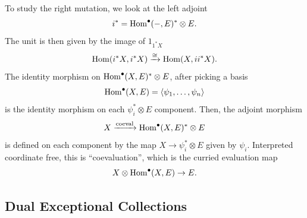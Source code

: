 \documentclass[12pt]{article}
\begin{document}
To study the right mutation, we look at the left adjoint
\[i^* = \mathrm{Hom}^\bullet(-,E)^* \otimes E.\]
The unit is then given by the image of $1_{1^* X}$
\[\mathrm{Hom}(i^* X, i^* X) \xrightarrow{\cong} \mathrm{Hom}(X, ii^* X).\]
The identity morphism on $\mathrm{Hom}^\bullet(X,E)^* \otimes E$, after picking a basis
\[\mathrm{Hom}^\bullet(X,E)=\left\langle\psi_1,\dots,\psi_n\right\rangle\]
is the identity morphism on each $\psi_i^* \otimes E$ component. Then, the adjoint morphism
\[X \xrightarrow{\mathrm{coeval}} \mathrm{Hom}^\bullet(X,E)^* \otimes E\]
is defined on each component by the map $X\to \psi_i^* \otimes E$ given by $\psi_i$. Interpreted coordinate free, this is ``coevaluation'', which is the curried evaluation map
\[X \otimes \mathrm{Hom}^\bullet(X,E) \to E.\]

\subsection{Dual Exceptional Collections}




\nocite{*} %
\end{document}
